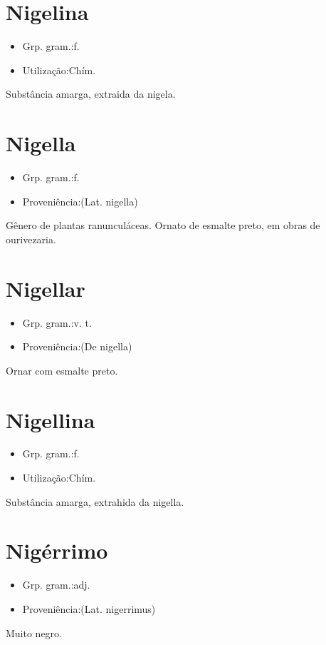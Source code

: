 \section{Nigelina}
\begin{itemize}
\item {Grp. gram.:f.}
\end{itemize}
\begin{itemize}
\item {Utilização:Chím.}
\end{itemize}
Substância amarga, extraida da nigela.
\section{Nigella}
\begin{itemize}
\item {Grp. gram.:f.}
\end{itemize}
\begin{itemize}
\item {Proveniência:(Lat. \textunderscore nigella\textunderscore )}
\end{itemize}
Gênero de plantas ranunculáceas.
Ornato de esmalte preto, em obras de ourivezaria.
\section{Nigellar}
\begin{itemize}
\item {Grp. gram.:v. t.}
\end{itemize}
\begin{itemize}
\item {Proveniência:(De \textunderscore nigella\textunderscore )}
\end{itemize}
Ornar com esmalte preto.
\section{Nigellina}
\begin{itemize}
\item {Grp. gram.:f.}
\end{itemize}
\begin{itemize}
\item {Utilização:Chím.}
\end{itemize}
Substância amarga, extrahida da nigella.
\section{Nigérrimo}
\begin{itemize}
\item {Grp. gram.:adj.}
\end{itemize}
\begin{itemize}
\item {Proveniência:(Lat. \textunderscore nigerrimus\textunderscore )}
\end{itemize}
Muito negro.
